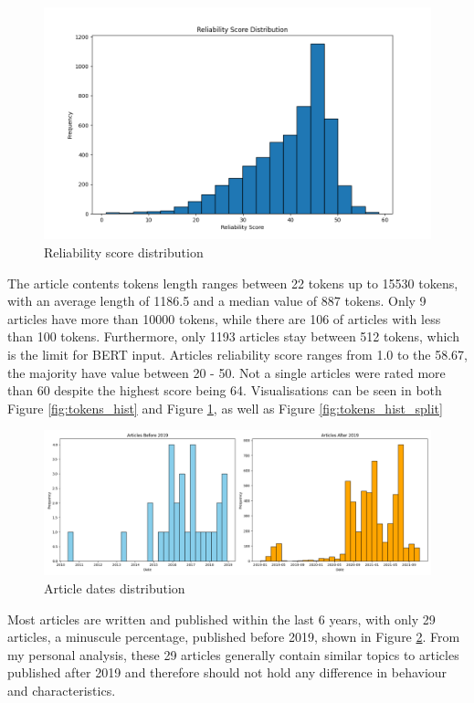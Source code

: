 \begin{figure}[ht]
    \centering
    \includegraphics[width=0.9\linewidth]{figures/reliability_score_hist.png}
    \caption{Reliability score distribution}
    \label{fig:reliability_score_hist}
\end{figure}

The article contents tokens length ranges between 22 tokens up to 15530 tokens, with an average length of 1186.5 and a median value of 887 tokens. Only 9 articles have more than 10000 tokens, while there are 106 of articles with less than 100 tokens. Furthermore, only 1193 articles stay between 512 tokens, which is the limit for BERT input. Articles reliability score ranges from 1.0 to the 58.67, the majority have value between 20 - 50. Not a single articles were rated more than 60 despite the highest score being 64. Visualisations can be seen in both Figure \ref{fig:tokens_hist} and Figure \ref{fig:reliability_score_hist}, as well as Figure \ref{fig:tokens_hist_split}


\begin{figure}[ht]
    \includegraphics[width=0.9\linewidth]{figures/dates_hist.png}
    \caption{Article dates distribution}
    \label{fig:dates_hist}
\end{figure}

Most articles are written and published within the last 6 years, with only 29 articles, a minuscule percentage, published before 2019, shown in Figure \ref{fig:dates_hist}. From my personal analysis, these 29 articles generally contain similar topics to articles published after 2019 and therefore should not hold any difference in behaviour and characteristics.


